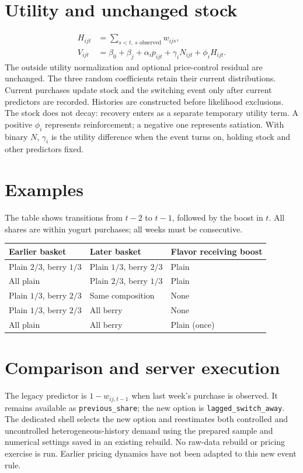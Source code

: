 \documentclass[11pt]{article}
\begin{document}
\section*{Utility and unchanged stock}
\begin{align*}
 H_{ijt}&=\sum_{s<t,\ s\text{ observed}}w_{ijs},\\
 V_{ijt}&=\beta_0+\beta_j+\alpha_i p_{ijt}
                +\gamma_i N_{ijt}+\phi_i H_{ijt}.
\end{align*}
The outside utility normalization and optional price-control residual are
unchanged. The three random coefficients retain their current distributions.
Current purchases update stock and the switching event only after current
predictors are recorded. Histories are constructed before likelihood exclusions.
The stock does not decay: recovery enters as a separate temporary utility term.
A positive $\phi_i$ represents reinforcement; a negative one represents satiation.
With binary $N$, $\gamma_i$ is the utility difference when the event turns on,
holding stock and other predictors fixed.

\section*{Examples}
The table shows transitions from $t-2$ to $t-1$, followed by the boost in $t$.
All shares are within yogurt purchases; all weeks must be consecutive.
\begin{center}\begin{tabular}{lll}\toprule
Earlier basket & Later basket & Flavor receiving boost\\\midrule
Plain $2/3$, berry $1/3$ & Plain $1/3$, berry $2/3$ & Plain\\
All plain & Plain $2/3$, berry $1/3$ & Plain\\
Plain $1/3$, berry $2/3$ & Same composition & None\\
Plain $1/3$, berry $2/3$ & All berry & None\\
All plain & All berry & Plain (once)\\\bottomrule
\end{tabular}\end{center}

\section*{Comparison and server execution}
The legacy predictor is $1-w_{ij,t-1}$ when last week's purchase is observed.
It remains available as \texttt{previous\_share}; the new option is
\texttt{lagged\_switch\_away}. The dedicated shell selects the new option
and reestimates both controlled and uncontrolled heterogeneous-history demand
using the prepared sample and numerical settings saved in an existing rebuild.
No raw-data rebuild or pricing exercise is run. Earlier pricing dynamics have
not been adapted to this new event rule.
\end{document}
